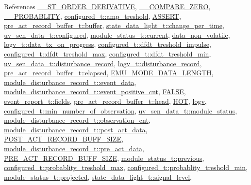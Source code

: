 References \hyperlink{a00021_source_l00030}{\+\_\+\+\_\+S\+T\+\_\+\+O\+R\+D\+E\+R\+\_\+\+D\+E\+R\+I\+V\+A\+T\+I\+V\+E}, \hyperlink{a00021_source_l00027}{\+\_\+\+\_\+\+C\+O\+M\+P\+A\+R\+E\+\_\+\+Z\+E\+R\+O}, \hyperlink{a00021_source_l00033}{\+\_\+\+\_\+\+P\+R\+O\+B\+A\+B\+L\+I\+T\+Y}, \hyperlink{a00021_a4b3bbfb0267daea1432f2603825ade62}{configured\+\_\+t\+::amp\+\_\+treshold}, \hyperlink{a00072_source_l00059}{A\+S\+S\+E\+R\+T}, \hyperlink{a00022_source_l00137}{pre\+\_\+act\+\_\+record\+\_\+buffer\+\_\+t\+::buffer}, \hyperlink{a00017_source_l00148}{state\+\_\+data\+\_\+light\+\_\+t\+::change\+\_\+per\+\_\+time}, \hyperlink{a00035_source_l00044}{uv\+\_\+sen\+\_\+data\+\_\+t\+::configured}, \hyperlink{a00017_source_l00156}{module\+\_\+status\+\_\+t\+::current}, \hyperlink{a00060_source_l00016}{data\+\_\+non\+\_\+volatile}, \hyperlink{a00021_a6cdefde69642ef511e3252c38be68516}{logv\+\_\+t\+::data\+\_\+tx\+\_\+on\+\_\+progress}, \hyperlink{a00021_source_l00189}{configured\+\_\+t\+::dfdt\+\_\+treshold\+\_\+impulse}, \hyperlink{a00021_source_l00190}{configured\+\_\+t\+::dfdt\+\_\+treshold\+\_\+max}, \hyperlink{a00021_source_l00191}{configured\+\_\+t\+::dfdt\+\_\+treshold\+\_\+min}, \hyperlink{a00035_source_l00049}{uv\+\_\+sen\+\_\+data\+\_\+t\+::disturbance\+\_\+record}, \hyperlink{a00021_a11ed024c2cc5c53c79b2c0a8b35e3c06}{logv\+\_\+t\+::disturbance\+\_\+record}, \hyperlink{a00022_source_l00140}{pre\+\_\+act\+\_\+record\+\_\+buffer\+\_\+t\+::elapsed}, \hyperlink{a00022_source_l00015}{E\+M\+U\+\_\+\+M\+O\+D\+E\+\_\+\+D\+A\+T\+A\+\_\+\+L\+E\+N\+G\+T\+H}, \hyperlink{a00022_source_l00228}{module\+\_\+disturbance\+\_\+record\+\_\+t\+::event\+\_\+data}, \hyperlink{a00022_source_l00182}{module\+\_\+disturbance\+\_\+record\+\_\+t\+::event\+\_\+positive\+\_\+cnt}, \hyperlink{a00040_source_l00086}{F\+A\+L\+S\+E}, \hyperlink{a00021_a5296d090c085b0421fdf5a86e382abea}{event\+\_\+report\+\_\+t\+::fields}, \hyperlink{a00022_source_l00142}{pre\+\_\+act\+\_\+record\+\_\+buffer\+\_\+t\+::head}, \hyperlink{a00021_source_l00153}{H\+O\+T}, \hyperlink{a00038_source_l00036}{logv}, \hyperlink{a00021_source_l00200}{configured\+\_\+t\+::min\+\_\+number\+\_\+of\+\_\+observation}, \hyperlink{a00035_source_l00053}{uv\+\_\+sen\+\_\+data\+\_\+t\+::module\+\_\+status}, \hyperlink{a00022_source_l00180}{module\+\_\+disturbance\+\_\+record\+\_\+t\+::observation\+\_\+cnt}, \hyperlink{a00022_source_l00177}{module\+\_\+disturbance\+\_\+record\+\_\+t\+::post\+\_\+act\+\_\+data}, \hyperlink{a00022_source_l00014}{P\+O\+S\+T\+\_\+\+A\+C\+T\+\_\+\+R\+E\+C\+O\+R\+D\+\_\+\+B\+U\+F\+F\+\_\+\+S\+I\+Z\+E}, \hyperlink{a00022_source_l00176}{module\+\_\+disturbance\+\_\+record\+\_\+t\+::pre\+\_\+act\+\_\+data}, \hyperlink{a00022_source_l00013}{P\+R\+E\+\_\+\+A\+C\+T\+\_\+\+R\+E\+C\+O\+R\+D\+\_\+\+B\+U\+F\+F\+\_\+\+S\+I\+Z\+E}, \hyperlink{a00017_source_l00157}{module\+\_\+status\+\_\+t\+::previous}, \hyperlink{a00021_source_l00202}{configured\+\_\+t\+::probablity\+\_\+treshold\+\_\+max}, \hyperlink{a00021_source_l00201}{configured\+\_\+t\+::probablity\+\_\+treshold\+\_\+min}, \hyperlink{a00017_a6b2516d74583418cec324c50041421c9}{module\+\_\+status\+\_\+t\+::projected}, \hyperlink{a00017_source_l00147}{state\+\_\+data\+\_\+light\+\_\+t\+::signal\+\_\+level}, 